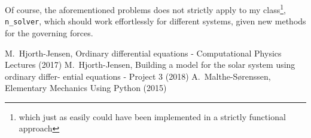 \documentclass[10pt,showpacs,preprintnumbers,amsmath,amssymb,nofootinbib,aps,prl,twocolumn,groupedaddress,superscriptaddress,showkeys]{revtex4-1}
\begin{document}
  Of course, the aforementioned problems does not strictly apply to my class\footnote{which just as easily could have been implemented in a strictly functional approach}, \lstinline{n_solver}, which should work effortlessly for different systems, given new methods for the governing forces.


\begin{thebibliography}{99}
 M.~Hjorth-Jensen, Ordinary differential equations - Computational Physics Lectures (2017)
 M.~Hjorth-Jensen, Building a model for the solar system using ordinary differ-
ential equations - Project 3 (2018)
 A.~Malthe-Sørenssen, Elementary Mechanics Using Python (2015)
\end{thebibliography}

\appendix
\end{document}
